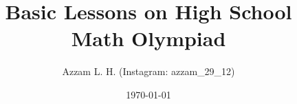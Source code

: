 \documentclass[11pt]{scrartcl}
\begin{document}
\title{Basic Lessons on High School Math Olympiad}
\date{\today}
\author{Azzam L. H. (Instagram: azzam\_29\_12)}
\maketitle
\renewcommand*\contentsname{Daftar Isi}
\tableofcontents
\newpage






\end{document}
